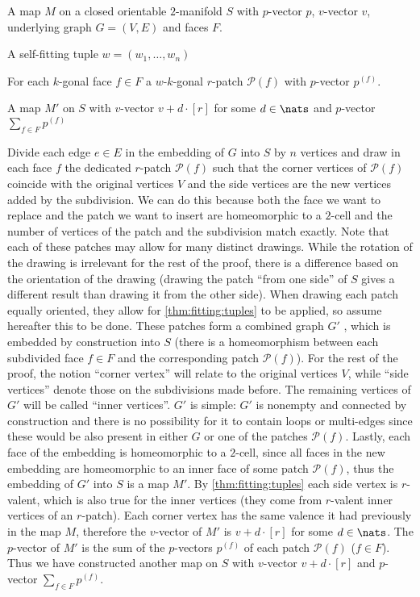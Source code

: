 \begin{construction}\label{const:map}
  \begin{cinput}
  \item A map $M$ on a closed orientable $2$-manifold $S$ with $p$-vector $p$, $v$-vector $v$, underlying graph $G = (V, E)$ and faces $F$. 
  \item A self-fitting tuple $w = (w_1, \dots, w_n)$
  \item For each $k$-gonal face $f \in F$ a $w$-$k$-gonal $r$-patch $\mathcal{P}(f)$ with $p$-vector $p^{(f)}$.
  \end{cinput}
  \begin{coutput}
    \item A map $M'$ on $S$ with $v$-vector $v + d \cdot [r]$ for some $d \in \nats$ and $p$-vector $\sum_{f \in F} p^{(f)}$
  \end{coutput} 
  \begin{cdescription} 
    Divide each edge $e \in E$ in the embedding of $G$ into $S$ by $n$ vertices and draw in each face $f$ the dedicated $r$-patch $\mathcal{P}(f)$ such that the corner vertices of $\mathcal{P}(f)$ coincide with the original vertices $V$ and the side vertices are the new vertices added by the subdivision. We can do this because both the face we want to replace and the patch we want to insert are homeomorphic to a $2$-cell and the number of vertices of the patch and the subdivision match exactly. Note that each of these patches may allow for many distinct drawings. While the rotation of the drawing is irrelevant for the rest of the proof, there is a difference based on the orientation of the drawing (drawing the patch “from one side” of $S$ gives a different result than drawing it from the other side). When drawing each patch equally oriented, they allow for \autoref{thm:fitting:tuples} to be applied, so assume hereafter this to be done. These patches form a combined graph $G'$ , which is embedded by construction into $S$ (there is a homeomorphism between each subdivided face $f \in F$ and the corresponding patch $\mathcal{P}(f)$). For the rest of the proof, the notion ``corner vertex'' will relate to the original vertices $V$, while ``side vertices'' denote those on the subdivisions made before. The remaining vertices of $G'$ will be called ``inner vertices''. $G'$ is simple: $G'$ is nonempty and connected by construction and there is no possibility for it to contain loops or multi-edges since these would be also present in either $G$ or one of the patches $\mathcal{P}(f)$. Lastly, each face of the embedding is homeomorphic to a $2$-cell, since all faces in the new embedding are homeomorphic to an inner face of some patch $\mathcal{P}(f)$, thus the embedding of $G'$ into $S$ is a map $M'$. By \autoref{thm:fitting:tuples} each side vertex is $r$-valent, which is also true for the inner vertices (they come from $r$-valent inner vertices of an $r$-patch). Each corner vertex has the same valence it had previously in the map $M$, therefore the $v$-vector of $M'$ is $v + d \cdot [r]$ for some $d \in \nats$. The $p$-vector of $M'$ is the sum of the $p$-vectors $p^{(f)}$ of each patch $\mathcal{P}(f)$ ($f \in F$). Thus we have constructed another map on $S$ with $v$-vector $v + d \cdot [r]$ and $p$-vector $\sum_{f \in F} p^{(f)}$.

\end{cdescription}
\end{construction}
